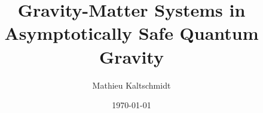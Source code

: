 \title{Gravity-Matter Systems in Asymptotically Safe Quantum Gravity}
\author{Mathieu Kaltschmidt}
\date{\today}

\newtheorem{statements}{Statements}[chapter]

\usepackage{fancyhdr}
\fancyhfoffset{0pt}

\usepackage[a4paper,
			width = 150mm,
			top = 30mm,
		    bottom=30mm,
		    ]{geometry}
\usepackage[onehalfspacing]{setspace}


\renewcommand{\chaptermark}[1]{
    \markboth{\mbox{\@chapapp}\ \thechapter.\ \ #1}{}%
}
\renewcommand{\sectionmark}[1]{
    \markright{\thesection\ \ #1}{}
}

\renewcommand*\raggedchapter{\centering}
\renewcommand*{\chapterformat}{%
  \chapappifchapterprefix{\nobreakspace}\thechapter\autodot%
  \IfUsePrefixLine{%
    \par\nobreak\vspace{-\parskip}\vspace{-.6\baselineskip}%
    \rule{0.9\textwidth}{0.5pt}\vspace{-1\baselineskip}%
  }{\enskip}%
}
\renewcommand\chapterlineswithprefixformat[3]{%
#2#3
}



\pagestyle{fancy}
	\fancyhf{}
	\fancyhead[LE]{\footnotesize\nouppercase{\leftmark}}
	\fancyhead[RO]{\footnotesize\nouppercase{\rightmark}}
	\fancyfoot[C]{\thepage}
	\renewcommand{\headrulewidth}{0.2pt}
	\renewcommand{\footrulewidth}{0pt}



\usepackage{amsmath, amssymb, commath, mathtools}
\usepackage{physics}
\usepackage{slashed}
\usepackage[hyperref]{ntheorem}
\usepackage{xfrac}
\usepackage[separate-uncertainty]{siunitx}
\usepackage{relsize} %
\usepackage{bbm}

